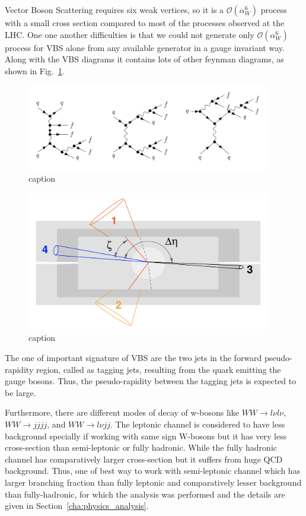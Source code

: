 Vector Boson Scattering requires six weak vertices, so it is a $\mathcal{O}(\alpha^6_W)$ process with a small cross section compared to most of the processes observed at the LHC. One one another difficulties is that we could not generate only $\mathcal{O}(\alpha^6_W)$ process for VBS alone from any available generator in a gauge invariant way. Along with the VBS diagrams it contains lots of other feynman diagrams, as shown in Fig.~\ref{fig:non-vbs}.
\begin{figure}[htbp]
    \centering
    \includegraphics[width=0.95\textwidth]{Pictures/non-vbs.png}
    \caption{caption}
    \label{fig:non-vbs}
\end{figure}
\begin{figure}[htbp]
    \centering
    \includegraphics[width=0.95\textwidth]{Pictures/vbs_detector.png}
    \caption{caption}
    \label{fig:vbs_detector}
\end{figure}


The one of important signature of VBS are the two jets in the forward pseudo-rapidity region, called as tagging jets, resulting from the quark emitting the gauge bosons. Thus, the pseudo-rapidity between the tagging jets is expected to be large.

Furthermore, there are different modes of decay of w-bosons like $WW \rightarrow l \nu l\nu $, $WW \rightarrow jj jj $, and $WW \rightarrow l \nu jj$. The leptonic channel is considered to have less background specially if working with same sign W-bosons but it has very less cross-section than semi-leptonic or fully hadronic. While the fully hadronic channel has comparatively larger cross-section but it suffers from huge QCD background. Thus, one of best way to work with semi-leptonic channel which has larger branching fraction than fully leptonic and comparatively lesser background than fully-hadronic, for which the analysis was performed and the details are given in Section~\ref{cha:physics_analysis}.

